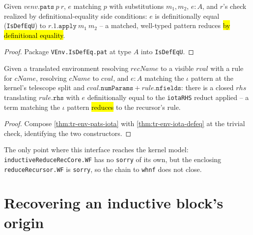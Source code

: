 \begin{lemma}
\label{thm:tr-env-iota-defeq}
\leanok
{}

 Given $venv.\mathtt{pats}\ p\ r$, $e$ matching $p$ with substitutions
$m_1,m_2$, $e:A$, and $r$'s check realized by definitional-equality side conditions: $e$
is definitionally equal (\texttt{IsDefEqU}) to $r.1.\mathtt{apply}\ m_1\ m_2$ -- a matched,
well-typed pattern reduces \hl{by definitional equality}.
\end{lemma}
\begin{proof}
\leanok
{} Package \texttt{VEnv.IsDefEq.pat} at type $A$ into \texttt{IsDefEqU}.
\end{proof}

\begin{theorem}
\label{thm:tr-env-iota-rec}
\leanok
{}

 Given a translated environment resolving $recName$ to a visible $rval$
with a rule for $cName$, resolving $cName$ to $cval$, and $e:A$ matching the $\iota$
pattern at the kernel's telescope split and $cval.\mathtt{numParams} +
rule.\mathtt{nfields}$: there is a closed $rhs$ translating $rule.\mathtt{rhs}$ with $e$
definitionally equal to the \texttt{iotaRHS} reduct applied -- a term matching the $\iota$
pattern \hl{reduces} to the recursor's rule.
\end{theorem}
\begin{proof}
\leanok
{} Compose \ref{thm:tr-env-pats-iota} with \ref{thm:tr-env-iota-defeq} at the
trivial check, identifying the two constructors.
\end{proof}
\begin{remark}
 The only point where this interface reaches the kernel model:
\texttt{inductiveReduceRecCore.WF} has no \texttt{sorry} of its own, but the enclosing
\texttt{reduceRecursor.WF} is \texttt{sorry}, so the chain to \texttt{whnf} does not close.
\end{remark}

\section{Recovering an inductive block's origin}

